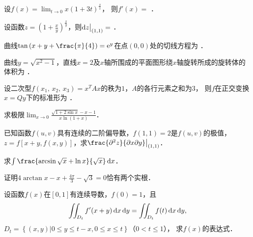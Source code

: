 \documentclass[plain,noanswer,medmath]{../../template/jnuexam}
\begin{document}


\begin{problem}
设$f(x) = \lim_{t \to 0} x(1 + 3t)^{\frac{x}{t}}$，
则$f'(x) =$ \fillin{}．
\end{problem}


\begin{problem}
设函数$z = \left(1 + \frac{x}{y} \right)^{\frac{x}{y}}$，则$\mathop{}\!\mathrm{d} z\big|_{(1,1)} =$ \fillin{}．
\end{problem}


\begin{problem}
曲线$\tan \left(x + y + \frac{\pi}{4} \right) = \e^{y}$在点$\left(0,0 \right)$处的切线方程为 \fillin{}．
\end{problem}


\begin{problem}
曲线$y = \sqrt{x^{2} - 1}$，直线$x = 2$及$x$轴所围成的平面图形绕$x$轴旋转所成的旋转体的体积为 \fillin{}．
\end{problem}


\begin{problem}
设二次型$f\left(x_{1},\,x_{2},\,x_{3} \right) = x^T Ax$的秩为$1$，$A$的各行元素之和为$3$，
则$f$在正交变换$x = Qy$下的标准形为 \fillin{}．
\end{problem}






\begin{problem}[points=10]
求极限$\lim_{x \to 0} \frac{\sqrt{1 + 2\sin x} - x - 1}{x\ln \left(1 + x \right)}$．
\end{problem}


\begin{problem}[points=10]
已知函数$f(u,v)$具有连续的二阶偏导数，$f(1,1) = 2$是$f(u,v)$的极值，
$z = f[x+y, f(x,y)]$，求$\frac{\pd^2 z}{\pdx\pd y}\big|_{(1,1)}$．
\end{problem}


\begin{problem}[points=10]
求$\int \frac{\arcsin \sqrt{x} + \ln x}{\sqrt{x}} \dx$．
\end{problem}


\begin{problem}[points=10]
证明$4\arctan x - x + \frac{4\pi}{3} - \sqrt{3} = 0$恰有两个实根．
\end{problem}


\begin{problem}[points=10]
设函数$f(x)$在$[0,1]$有连续导数，$f(0) = 1$，且
$$\iint_{D_t} f'(x + y)\mathop{}\!\mathrm{d} x\mathop{}\!\mathrm{d} y = \iint_{D_t} f(t)\mathop{}\!\mathrm{d} x\mathop{}\!\mathrm{d} y,$$ 
$D_t = \left\{(x,y)\left| 0 \le y \le t - x,0 \le x \le t \right. \right\}$（$0 < t \le 1$），
求$f(x)$的表达式．
\end{problem}
\end{document}

